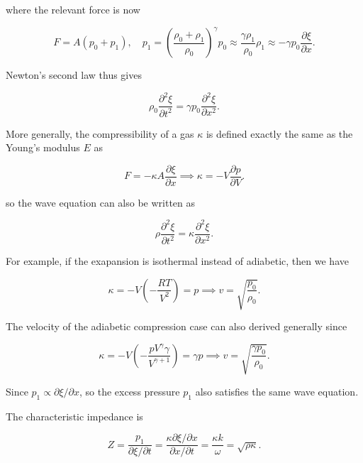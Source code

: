 \documentclass[a4paper,12pt]{report}
\begin{document}
where the relevant force is now 

\begin{equation}
	F = A(p_0 + p_1 ), \quad p_1 = \left(\frac{\rho _{0} + \rho _{1}  }{\rho _{0} }\right)^{\gamma } p_0 \approx \frac{\gamma \rho _{1} }{\rho _{0} }\rho _{1} \approx - \gamma p_0 \frac{\partial \xi }{\partial x}.
\end{equation}

Newton's second law thus gives 

\begin{equation}
	\rho _{0} \frac{\partial^2 \xi }{\partial t^2} = \gamma p_0 \frac{\partial^2 \xi }{\partial x^2}. 
\end{equation}

More generally, the compressibility of a gas \(\kappa \) is defined exactly the same as the Young's modulus \(E\) as

\begin{equation}
	F = -\kappa A \frac{\partial \xi }{\partial x} \implies \kappa = -V \frac{\partial p}{\partial V}.  
\end{equation}

so the wave equation can also be written as 

\begin{equation}
	\rho \frac{\partial^2 \xi }{\partial t^2} = \kappa \frac{\partial^2 \xi }{\partial x^2}.  
\end{equation}

For example, if the exapansion is isothermal instead of adiabetic, then we have

\begin{equation}
	\kappa = -V \left( -\frac{RT}{V^2}  \right) = p \implies v = \sqrt{\frac{p_0 }{\rho _{0} } }. 
\end{equation}

The velocity of the adiabetic compression case can also derived generally since 

\begin{equation}
	\kappa = -V \left( -\frac{pV^{\gamma }\gamma  }{V^{\gamma +1} }  \right) = \gamma p \implies v = \sqrt{\frac{\gamma p_0 }{\rho _{0} } }. 
\end{equation}



Since \(p_1 \propto \partial \xi /\partial x\), so the excess pressure \(p_1 \) also satisfies the same wave equation.  

The characteristic impedance is 

\begin{equation}
	Z = \frac{p_1 }{\partial \xi  /\partial t } = \frac{\kappa \partial \xi /\partial x }{\partial x /\partial t} = \frac{\kappa k}{\omega } = \sqrt{\rho \kappa }.     
\end{equation}
\end{document}
